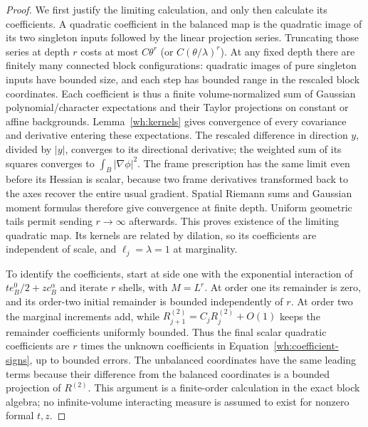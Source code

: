 \begin{proof}
We first justify the limiting calculation, and only then calculate
its coefficients.  A quadratic coefficient in the balanced map is
the quadratic image of its two singleton inputs followed by the
linear projection series.  Truncating those series at depth $r$
costs at most $C\theta^r$ (or $C(\theta/\lambda)^r$).  At any fixed
depth there are finitely many connected block configurations:
quadratic images of pure singleton inputs have bounded size, and
each step has bounded range in the rescaled block coordinates.
Each coefficient is thus a finite volume-normalized sum of Gaussian
polynomial/character expectations and their Taylor projections on
constant or affine backgrounds.  Lemma~\ref{wh:kernels} gives
convergence of every covariance and derivative entering these
expectations.  The rescaled difference in direction $y$, divided
by $|y|$, converges to its directional derivative; the weighted sum
of its squares converges to $\int_B|\nabla\phi|^2$.  The frame
prescription has the same limit even before its Hessian is scalar,
because two frame derivatives transformed back to the axes recover
the entire usual gradient.  Spatial Riemann sums and Gaussian
moment formulas therefore give convergence at finite depth.
Uniform geometric tails permit sending $r\to\infty$ afterwards.
This proves existence of the limiting quadratic map.  Its kernels
are related by dilation, so its coefficients are independent of
scale, and $\ell_j=\lambda=1$ at marginality.

To identify the coefficients, start at side one with the exponential
interaction of $t e_B^0/2+zc_B^\alpha$ and iterate $r$ shells, with
$M=L^r$.  At order one its remainder is zero, and its order-two
initial remainder is bounded independently of $r$.  At order two
the marginal increments add, while
$R^{(2)}_{j+1}=C_jR^{(2)}_j+O(1)$ keeps the remainder coefficients
uniformly bounded.  Thus the final scalar quadratic coefficients
are $r$ times the unknown coefficients in
Equation~\eqref{wh:coefficient-signs}, up to bounded errors.  The
unbalanced coordinates have the same leading terms because their
difference from the balanced coordinates is a bounded projection
of $R^{(2)}$.  This argument is a finite-order calculation in the
exact block algebra; no infinite-volume interacting measure is
assumed to exist for nonzero formal $t,z$.


\end{proof}
